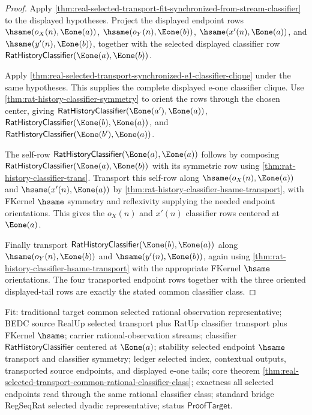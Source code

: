 \begin{proof}
Apply
\autoref{thm:real-selected-transport-fit-synchronized-from-stream-classifier}
to the displayed hypotheses. Project the displayed endpoint rows
$\hsame(o_X(n),\Eone(a))$, $\hsame(o_Y(n),\Eone(b))$,
$\hsame(x'(n),\Eone(a))$, and $\hsame(y'(n),\Eone(b))$, together with the
selected displayed classifier row
$\mathsf{RatHistoryClassifier}(\Eone(a),\Eone(b))$.

Apply
\autoref{thm:real-selected-transport-synchronized-e1-classifier-clique} under
the same hypotheses. This supplies the complete displayed e-one classifier
clique. Use \autoref{thm:rat-history-classifier-symmetry} to orient the rows
through the chosen center, giving
$\mathsf{RatHistoryClassifier}(\Eone(a'),\Eone(a))$,
$\mathsf{RatHistoryClassifier}(\Eone(b),\Eone(a))$, and
$\mathsf{RatHistoryClassifier}(\Eone(b'),\Eone(a))$.

The self-row
$\mathsf{RatHistoryClassifier}(\Eone(a),\Eone(a))$ follows by composing
$\mathsf{RatHistoryClassifier}(\Eone(a),\Eone(b))$ with its symmetric row using
\autoref{thm:rat-history-classifier-trans}. Transport this self-row along
$\hsame(o_X(n),\Eone(a))$ and $\hsame(x'(n),\Eone(a))$ by
\autoref{thm:rat-history-classifier-hsame-transport}, with FKernel $\hsame$
symmetry and reflexivity supplying the needed endpoint orientations. This gives
the $o_X(n)$ and $x'(n)$ classifier rows centered at $\Eone(a)$.

Finally transport
$\mathsf{RatHistoryClassifier}(\Eone(b),\Eone(a))$ along
$\hsame(o_Y(n),\Eone(b))$ and $\hsame(y'(n),\Eone(b))$, again using
\autoref{thm:rat-history-classifier-hsame-transport} with the appropriate
FKernel $\hsame$ orientations. The four transported endpoint rows together with
the three oriented displayed-tail rows are exactly the stated common
classifier class.
\end{proof}

Fit: traditional target common selected rational observation representative;
BEDC source RealUp selected transport plus RatUp classifier transport plus
FKernel $\hsame$; carrier rational-observation streams; classifier
$\mathsf{RatHistoryClassifier}$ centered at $\Eone(a)$; stability selected
endpoint $\hsame$ transport and classifier symmetry; ledger selected index,
contextual outputs, transported source endpoints, and displayed e-one tails;
core theorem
\autoref{thm:real-selected-transport-common-rational-classifier-class};
exactness all selected endpoints read through the same rational classifier
class; standard bridge RegSeqRat selected dyadic representative; status
$\mathsf{ProofTarget}$.

